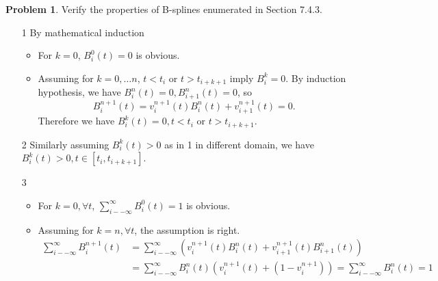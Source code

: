 \documentclass[a4paper]{book}
\makeatletter
\newenvironment{sol}[1][\solname]{\par
  \pushQED{\qed}
  \normalfont \topsep6\p@\@plus6\p@\relax
  \trivlist
  \item[\hskip\labelsep
        \itshape
    #1\@addpunct{.}]\ignorespaces
}{\popQED\endtrivlist\@endpefalse}
\providecommand{\solname}{Solution}
\numberwithin{equation}{chapter}
\theoremstyle{definition}
\newtheorem{pro}{Problem}
\makeatother
\begin{document}
  \begin{pro}
    Verify the properties of B-splines enumerated in Section 7.4.3.
  \end{pro}
  \begin{sol}
      \begin{itemize}
          \item [1] By mathematical induction 
          \begin{itemize}
              \item For $k = 0$, $B_i^0(t) = 0$ is obvious.
              \item Assuming for $k = 0,\ldots n$, $t<t_i$ or $t > t_{i+k+1}$ imply $B_i^k = 0$.
              By induction hypothesis, we have $B_i^n(t) = 0, B_{i + 1}^n(t) = 0$, so 
              \[B_i^{n+1}(t) = v_i^{n + 1}(t)B_i^n(t) +v_{i+1}^{n + 1}(t) = 0.\] 
              Therefore we have $B_i^k(t) = 0, t < t_i \text{ or } t> t_{i + k+ 1}$.
          \end{itemize}

          \item [2] Similarly assuming $B_i^k(t) > 0$ as in 1 in 
          different domain, we 
          have $B_i^k(t) > 0, t \in [t_i, t_{i + k +1}]$.

          \item [3] \begin{itemize}
              \item For $k = 0, \forall t$, $\sum_{i - -\infty}^\infty B_i^0(t) = 1$ is obvious.
              \item Assuming for $k = n, \forall t$, the assumption is right.
              \begin{align*}
                \sum_{i - -\infty}^\infty B_i^{n + 1}(t) &= 
                \sum_{i - -\infty}^\infty (v_i^{n + 1}(t)B_i^n(t) + v_{i + 1}^{n + 1}(t)B_{i+1}^n(t)) \\
                &=\sum_{i - -\infty}^\infty B_i^n(t) (v_i^{n+1}(t)
                + (1 - v_i^{n+1}) ) = \sum_{i - -\infty}^\infty B_i^n(t) = 1
              \end{align*}
          \end{itemize}


\end{itemize}
\end{sol}
\end{document}
